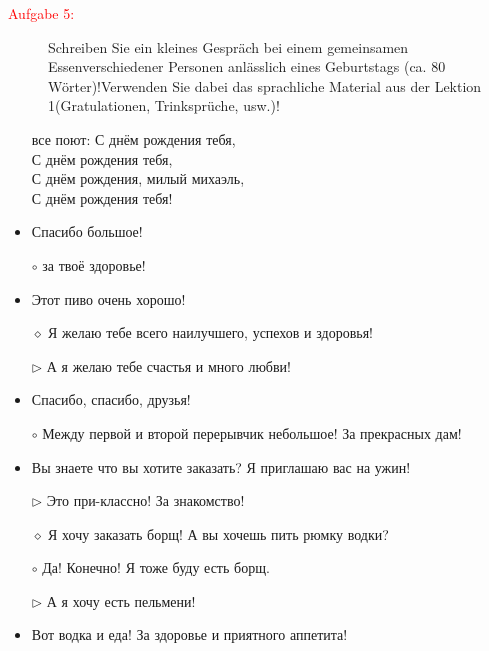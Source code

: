 \documentclass[a4paper]{article}
\theoremstyle{plain}
\begin{document}
\begin{description}
 	\item[\textcolor{red}{Aufgabe 5:}] Schreiben Sie ein kleines Gespräch bei einem gemeinsamen Essen\linebreak verschiedener Personen anlässlich eines Geburtstags (ca. 80 Wörter)!\linebreak Verwenden Sie dabei das sprachliche Material aus der Lektion 1\linebreak (Gratulationen, Trinksprüche, usw.)!

\end{description}
\vspace*{1cm}


\begin{itemize}
	\item[все поют:] 	С днём рождения тебя,\\
						С днём рождения тебя,\\
						С днём рождения, милый михаэль,\\
						С днём рождения тебя!
	\item Спасибо большое!
	\item[$\circ$] за твоё здоровье!
	\item Этот пиво очень хорошо!
	\item[$\diamond$] Я желаю тебе всего наилучшего, успехов и здоровья!
	\item[$\triangleright$] А я желаю тебе счастья и много любви!
	\item Спасибо, спасибо, друзья!
	\item[$\circ$] Между первой и второй перерывчик небольшое! За прекрасных дам! 
	\item Вы знаете что вы хотите заказать? Я приглашаю вас на ужин!
	\item[$\triangleright$] Это при-классно! За знакомство!
	\item[$\diamond$] Я хочу заказать борщ! А вы хочешь пить рюмку водки?
	\item[$\circ$] Да! Конечно! Я тоже буду есть борщ.
	\item[$\triangleright$] А я хочу есть пельмени!
	\item Вот водка и еда! За здоровье и приятного аппетита! 
\end{itemize}
\end{document}
